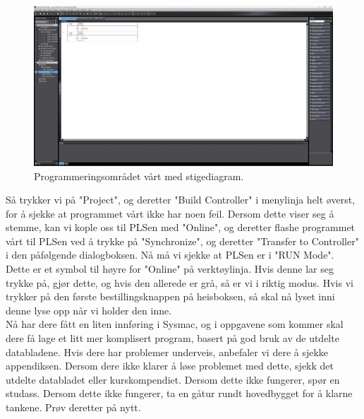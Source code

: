 \begin{alphasection}
\begin{figure}[ht]
    \centering
    \includegraphics[scale=0.2]{figures/full_rung.png}
    \caption{Programmeringsområdet vårt med stigediagram.}
    \label{fig:full_rung}
\end{figure}

Så trykker vi på "Project", og deretter "Build Controller" i menylinja helt øverst, for å sjekke at programmet vårt ikke har noen feil. Dersom dette viser seg å stemme, kan vi kople oss til PLSen med "Online", og deretter flashe programmet vårt til PLSen ved å trykke på "Synchronize", og deretter "Transfer to Controller" i den påfølgende dialogboksen. Nå må vi sjekke at PLSen er i "RUN Mode". Dette er et symbol til høyre for "Online" på verktøylinja. Hvis denne lar seg trykke på, gjør dette, og hvis den allerede er grå, så er vi i riktig modus. Hvis vi trykker på den første bestillingsknappen på heisboksen, så skal nå lyset inni denne lyse opp når vi holder den inne.\\

Nå har dere fått en liten innføring i Sysmac, og i oppgavene som kommer skal dere få lage et litt mer komplisert program, basert på god bruk av de utdelte databladene. Hvis dere har problemer underveis, anbefaler vi dere å sjekke appendiksen. Dersom dere ikke klarer å løse problemet med dette, sjekk det utdelte databladet eller kurskompendiet. Dersom dette ikke fungerer, spør en studass. Dersom dette ikke fungerer, ta en gåtur rundt hovedbygget for å klarne tankene. Prøv deretter på nytt.
\end{alphasection}

\setcounter{section}{0}